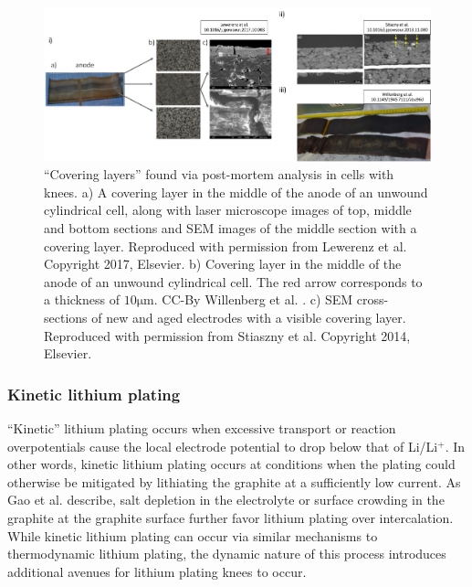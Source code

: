 \documentclass[journal=jpcl, manuscript=article, layout=onecolumn]{achemso}
\begin{document}
\begin{figure}[ht]
\centering
\includegraphics[scale = 0.5]{figures/CoveringLayers.pdf}
\caption{``Covering layers'' found via post-mortem analysis in cells with knees. a) A covering layer in the middle of the anode of an unwound cylindrical cell, along with laser microscope images of top, middle and bottom sections and SEM images of the middle section with a covering layer. Reproduced with permission from Lewerenz et al. \cite{lewerenz_post-mortem_2017} Copyright 2017, Elsevier. b) Covering layer in the middle of the anode of an unwound cylindrical cell. The red arrow corresponds to a thickness of $10 \mathrm{\mu m}$. CC-By Willenberg et al. \cite{willenberg_development_2020}. c) SEM cross-sections of new and aged electrodes with a visible covering layer. Reproduced with permission from Stiaszny et al. \cite{stiaszny_electrochemical_2014} Copyright 2014, Elsevier.}
\label{fig:covering_layers}
\end{figure}

\subsubsection{Kinetic lithium plating}

``Kinetic'' lithium plating occurs when excessive transport or reaction overpotentials cause the local electrode potential to drop below that of Li/Li$\mathrm{^+}$.
In other words, kinetic lithium plating occurs at conditions when the plating could otherwise be mitigated by lithiating the graphite at a sufficiently low current. As Gao et al.\cite{gao_interplay_2021} describe, salt depletion in the electrolyte or surface crowding in the graphite at the graphite surface further favor lithium plating over intercalation. While kinetic lithium plating can occur via similar mechanisms to thermodynamic lithium plating, the dynamic nature of this process introduces additional avenues for lithium plating knees to occur.
\end{document}
